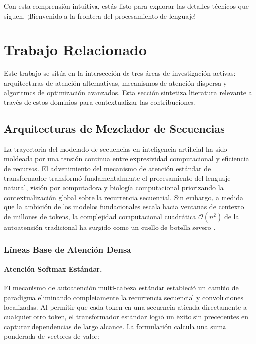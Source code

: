 \documentclass[11pt,a4paper]{article}
\begin{document}
Con esta comprensión intuitiva, estás listo para explorar las detalles técnicos que siguen. ¡Bienvenido a la frontera del procesamiento de lenguaje!

\section{Trabajo Relacionado}

Este trabajo se sitúa en la intersección de tres áreas de investigación activas: arquitecturas de atención alternativas, mecanismos de atención dispersa y algoritmos de optimización avanzados. Esta sección sintetiza literatura relevante a través de estos dominios para contextualizar las contribuciones.

\subsection{Arquitecturas de Mezclador de Secuencias}

La trayectoria del modelado de secuencias en inteligencia artificial ha sido moldeada por una tensión continua entre expresividad computacional y eficiencia de recursos. El advenimiento del mecanismo de atención estándar de transformador transformó fundamentalmente el procesamiento del lenguaje natural, visión por computadora y biología computacional priorizando la contextualización global sobre la recurrencia secuencial. Sin embargo, a medida que la ambición de los modelos fundacionales escala hacia ventanas de contexto de millones de tokens, la complejidad computacional cuadrática $\mathcal{O}(n^2)$ de la autoatención tradicional ha surgido como un cuello de botella severo \citep{vaswani_attention_2017}.

\subsubsection{Líneas Base de Atención Densa}

\paragraph{Atención Softmax Estándar.}
El mecanismo de autoatención multi-cabeza estándar estableció un cambio de paradigma eliminando completamente la recurrencia secuencial y convoluciones localizadas. Al permitir que cada token en una secuencia atienda directamente a cualquier otro token, el transformador estándar logró un éxito sin precedentes en capturar dependencias de largo alcance. La formulación calcula una suma ponderada de vectores de valor:
\end{document}
